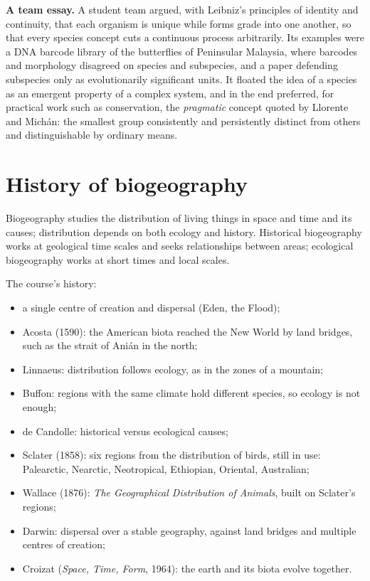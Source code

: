 \textbf{A team essay.} A student team
argued, with Leibniz's principles of
identity and continuity, that each
organism is unique while forms grade into
one another, so that every species concept
cuts a continuous process arbitrarily. Its
examples were a DNA barcode library of the
butterflies of Peninsular Malaysia, where
barcodes and morphology disagreed on
species and subspecies, and a paper
defending subspecies only as evolutionarily
significant units. It floated the idea of a
species as an emergent property of a
complex system, and in the end preferred,
for practical work such as conservation,
the \emph{pragmatic} concept quoted by
Llorente and Mich\'an: the smallest group
consistently and persistently distinct from
others and distinguishable by ordinary
means.

\section{History of biogeography}
\label{section-biogeography-history}

Biogeography studies the distribution of
living things in space and time and its
causes; distribution depends on both
ecology and history. Historical
biogeography works at geological time
scales and seeks relationships between
areas; ecological biogeography works at
short times and local scales.

The course's history:
\begin{itemize}
\item a single centre of creation and
dispersal (Eden, the Flood);
\item Acosta (1590): the American biota
reached the New World by land bridges,
such as the strait of Ani\'an in the
north;
\item Linnaeus: distribution follows
ecology, as in the zones of a mountain;
\item Buffon: regions with the same
climate hold different species, so
ecology is not enough;
\item de Candolle: historical versus
ecological causes;
\item Sclater (1858): six regions from the
distribution of birds, still in use:
Palearctic, Nearctic, Neotropical,
Ethiopian, Oriental, Australian;
\item Wallace (1876): \emph{The Geographical
Distribution of Animals}, built on
Sclater's regions;
\item Darwin: dispersal over a stable
geography, against land bridges and
multiple centres of creation;
\item Croizat (\emph{Space, Time, Form},
1964): the earth and its biota evolve
together.
\end{itemize}

